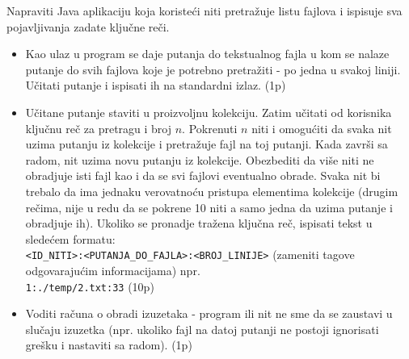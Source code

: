 \documentclass[]{article}
\begin{document}
\begin{enumerate}
  Napraviti Java aplikaciju koja koriste\'c{}i niti pretra\v{z}uje listu fajlova i ispisuje sva pojavljivanja zadate klju\v{c}ne re\v{c}i.
  \begin{itemize}
    \item Kao ulaz u program se daje putanja do tekstualnog fajla u kom se nalaze putanje do svih fajlova koje je potrebno pretra\v{z}iti - po jedna u svakoj liniji. U\v{c}itati putanje i ispisati ih na standardni izlaz. \hfill (1p)
    \item U\v{c}itane putanje staviti u proizvoljnu kolekciju. Zatim u\v{c}itati od korisnika klju\v{c}nu re\v{c} za pretragu i broj $n$. Pokrenuti $n$ niti i omogu\'c{}iti da svaka nit uzima putanju iz kolekcije i pretra\v{z}uje fajl na toj putanji. Kada zavr\v{s}i sa radom, nit uzima novu putanju iz kolekcije. Obezbediti da vi\v{s}e niti ne obradjuje isti fajl kao i da se svi fajlovi eventualno obrade. Svaka nit bi trebalo da ima jednaku verovatno\'c{}u pristupa elementima kolekcije (drugim re\v{c}ima, nije u redu da se pokrene 10 niti a samo jedna da uzima putanje i obradjuje ih). Ukoliko se pronadje tra\v{z}ena klju\v{c}na re\v{c}, ispisati tekst u slede\'c{}em formatu:\\
    \texttt{<ID\_NITI>:<PUTANJA\_DO\_FAJLA>:<BROJ\_LINIJE>} (zameniti tagove odgovaraju\'c{}im informacijama) npr.\\
    \texttt{1:./temp/2.txt:33} \hfill (10p)
    \item Voditi ra\v{c}una o obradi izuzetaka - program ili nit ne sme da se zaustavi u slu\v{c}aju izuzetka (npr. ukoliko fajl na datoj putanji ne postoji ignorisati gre\v{s}ku i nastaviti sa radom). \hfill (1p)
  \end{itemize}


\end{enumerate}
\end{document}
